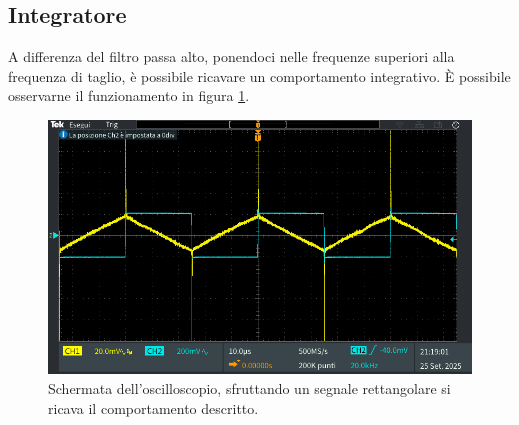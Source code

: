 \documentclass[a4paper,12pt]{article}
\begin{document}
\subsection*{Integratore}
A differenza del filtro passa alto, ponendoci nelle frequenze superiori alla frequenza di taglio, è possibile ricavare un comportamento integrativo. È possibile osservarne il funzionamento in figura \ref{fig:integratore_oscilloscopio}.

\begin{figure}[h]
    \centering
    \includegraphics[width = 0.8\linewidth]{immagini/plot_oscilloscopio/TEK00066.PNG}
    \caption{Schermata dell'oscilloscopio, sfruttando un segnale rettangolare si ricava il comportamento descritto.}
    \label{fig:integratore_oscilloscopio}
\end{figure}
\end{document}
